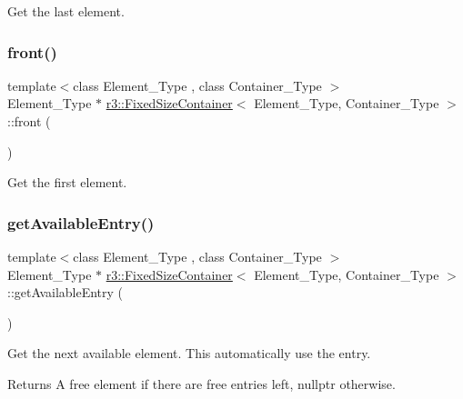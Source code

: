 Get the last element. 

\mbox{\label{classr3_1_1_fixed_size_container_ae60eda032ed2276552c7df4fc6da4640}} 
\subsubsection{\texorpdfstring{front()}{front()}}
{\footnotesize\ttfamily template$<$class Element\+\_\+\+Type , class Container\+\_\+\+Type $>$ \\
Element\+\_\+\+Type $\ast$ \mbox{\hyperlink{classr3_1_1_fixed_size_container}{r3\+::\+Fixed\+Size\+Container}}$<$ Element\+\_\+\+Type, Container\+\_\+\+Type $>$\+::front (\begin{DoxyParamCaption}{ }\end{DoxyParamCaption})}



Get the first element. 

\mbox{\label{classr3_1_1_fixed_size_container_a7903fc6d43600195b97218aead60a99a}} 
\subsubsection{\texorpdfstring{get\+Available\+Entry()}{getAvailableEntry()}}
{\footnotesize\ttfamily template$<$class Element\+\_\+\+Type , class Container\+\_\+\+Type $>$ \\
Element\+\_\+\+Type $\ast$ \mbox{\hyperlink{classr3_1_1_fixed_size_container}{r3\+::\+Fixed\+Size\+Container}}$<$ Element\+\_\+\+Type, Container\+\_\+\+Type $>$\+::get\+Available\+Entry (\begin{DoxyParamCaption}{ }\end{DoxyParamCaption})}



Get the next available element. This automatically use the entry. 

\begin{DoxyReturn}{Returns}
A free element if there are free entries left, nullptr otherwise. 
\end{DoxyReturn}
\mbox{\label{classr3_1_1_fixed_size_container_adbf383734c597677d4221278000886a3}} 
